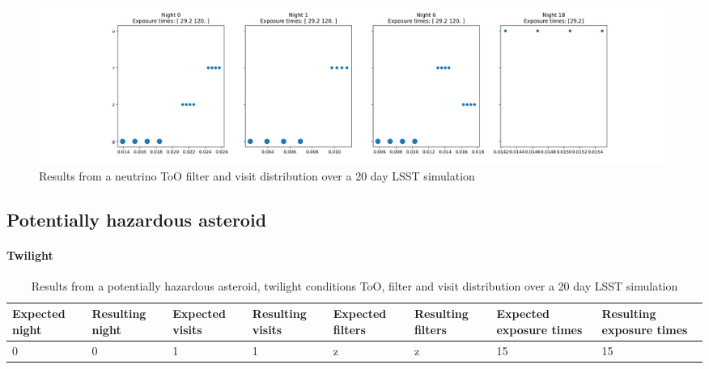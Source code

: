 \begin{figure}
    \centering
    \includegraphics[width=\linewidth]{figures/validationTests/SVRequired/NeutrinoFilterPlot.png}
    \caption{Results from a neutrino ToO filter and visit distribution over a 20 day LSST simulation}
    \label{fig:NeutrinoFilterResult}
\end{figure}
\newpage


\subsection{Potentially hazardous asteroid}
\paragraph{Twilight}
\begin{table}[]
\centering
\begin{adjustbox}{max width=\textwidth}
\begin{tabular}{|l|l|l|l|l|l|l|l|}
\hline
Expected night & Resulting night & Expected visits & Resulting visits & Expected filters & Resulting filters & Expected exposure times & Resulting exposure times \\ \hline
0              & 0               & 1               & 1                & z                & z                 & 15                      & 15                       \\ \hline
\end{tabular}
\end{adjustbox}
\caption{Results from a potentially hazardous asteroid, twilight conditions ToO, filter and visit distribution over a 20 day LSST simulation}
\label{tab:PHATwiResult}
\end{table}

